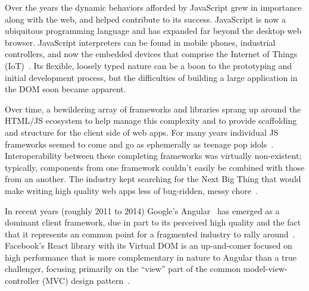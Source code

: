 Over the years the dynamic behaviors afforded by JavaScript grew in importance along with the web, and helped contribute to its success. 
JavaScript is now a ubiquitous programming language and has expanded far beyond the desktop web browser. 
JavaScript interpreters can be found in mobile phones, industrial controllers, and now the embedded devices that comprise the Internet of Things (IoT)~\cite{flaki2015}.
Its flexible, loosely typed nature can be a boon to the prototyping and initial development process,
but the difficulties of building a large application in the DOM soon became apparent.

Over time, a bewildering array of frameworks and libraries sprang up around the HTML/JS ecosystem to help manage this complexity and to provide scaffolding and structure for the client side of web apps.
For many years individual JS frameworks seemed to come and go as ephemerally as teenage pop idols~\cite{allenpike2015}. 
Interoperability between these completing frameworks was virtually non-existent; 
typically, components from one framework couldn't easily be combined with those from an another.
The industry kept searching for the Next Big Thing that would make writing high quality web apps less of bug-ridden, messy chore~\cite{allenpike2015}. 

In recent years (roughly 2011 to 2014) Google's Angular~\cite{googledevelopers2015-b}
has emerged as a dominant client framework, 
due in part to its perceived high quality and the fact that it represents an common point for a fragmented industry to rally around~\cite{dickey2014}.
Facebook's React library with its Virtual DOM is an up-and-comer focused on high performance that is more complementary in nature to Angular than a true challenger, 
focusing primarily on the ``view'' part of the common 
model-view-controller (MVC) 
design pattern~\cite{reactcontributors2015}.

